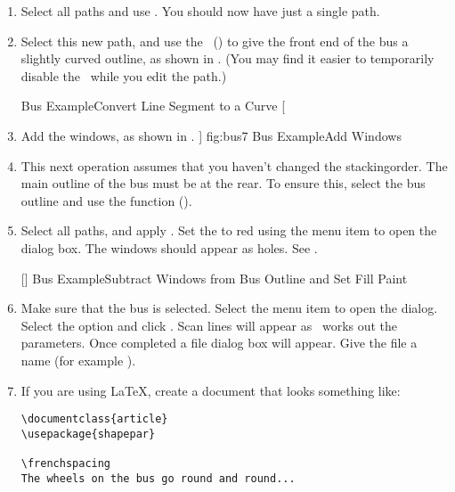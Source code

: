 \begin{enumerate}
\item Select all paths and use .
You should now have just a single \gls{path}.

\item Select this new \gls{path}, and use the
\editpathmode\ () to give the
front end of the bus a slightly curved outline, as
shown in . (You may find it easier to temporarily
disable the \gridlock\ while you edit the path.)

{}
{Bus Example\dash Convert Line Segment to a Curve}
[
   \item Add the windows, as shown in .
]
{fig:bus7}
{}
{Bus Example\dash Add Windows}

\item This next operation assumes that you haven't changed the
\gls{stackingorder}. The main outline of the bus must be at the
rear. To ensure this, select the bus outline and use the
 function ().

\item Select all paths, and apply .  Set
the  to red using the 
menu item to open the  dialog box.  The windows
should appear as holes. See .

[]
{}
{Bus Example\dash Subtract Windows from Bus Outline and Set
Fill Paint}

\item Make sure that the bus is selected. Select the
 menu item to open the 
dialog. Select the  option and click
. Scan lines will appear as \FlowframTk\
works out the parameters. Once completed a file dialog box will
appear. Give the file a name (for example \filefmt{busshape.tex}).

\item If you are using \LaTeX, create a document that looks something
like:
\begin{verbatim}
\documentclass{article}
\usepackage{shapepar}

\frenchspacing
The wheels on the bus go round and round...


\end{verbatim}


\end{enumerate}
